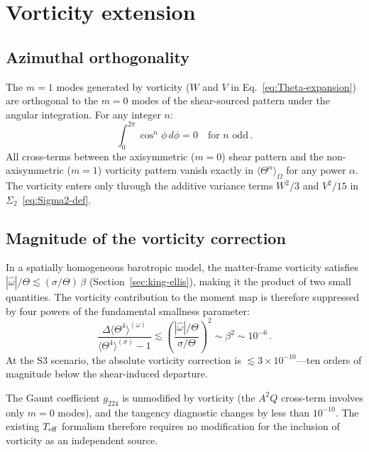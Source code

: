 \section{Vorticity extension}\label{sec:teff-vort}

\subsection{Azimuthal orthogonality}\label{sec:azimuth}

The $m = 1$ modes generated by vorticity ($W$ and $V$ in
Eq.~\eqref{eq:Theta-expansion}) are orthogonal to the $m = 0$
modes of the shear-sourced pattern under the angular
integration.  For any integer $n$:
\begin{equation}\label{eq:azimuth-orth}
\int_0^{2\pi}\cos^n\!\phi\,d\phi = 0
\quad\text{for $n$ odd}\,.
\end{equation}
All cross-terms between the axisymmetric ($m = 0$) shear
pattern and the non-axisymmetric ($m = 1$) vorticity pattern
vanish exactly in $\langle\Theta^\alpha\rangle_\Omega$ for any
power $\alpha$.  The vorticity enters only through the additive
variance terms $W^2/3$ and $V^2/15$ in
$\Sigma_2$~\eqref{eq:Sigma2-def}.


\subsection{Magnitude of the vorticity correction}
\label{sec:vort-magnitude}

In a spatially homogeneous barotropic model, the matter-frame
vorticity satisfies
$|\hat{\omega}|/\Theta \lesssim (\sigma/\Theta)\,\beta$
(Section~\ref{sec:king-ellis}), making it the product of two
small quantities.  The vorticity contribution to the moment map
is therefore suppressed by four powers of the fundamental
smallness parameter:
\begin{equation}\label{eq:vort-suppression}
\frac{\Delta\langle\Theta^4\rangle^{(\omega)}}
     {\langle\Theta^4\rangle^{(\sigma)} - 1}
\lesssim
\left(\frac{|\hat{\omega}|/\Theta}{\sigma/\Theta}\right)^2
\sim \beta^2
\sim 10^{-6}\,.
\end{equation}
At the S3 scenario, the absolute vorticity correction is
$\lesssim 3 \times 10^{-10}$---ten orders of magnitude below
the shear-induced departure.

The Gaunt coefficient $g_{224}$ is unmodified by vorticity (the
$A^2 Q$ cross-term involves only $m = 0$ modes), and the
tangency diagnostic changes by less than $10^{-10}$.  The
existing $T_{\mathrm{eff}}$ formalism therefore requires no modification
for the inclusion of vorticity as an independent source.


